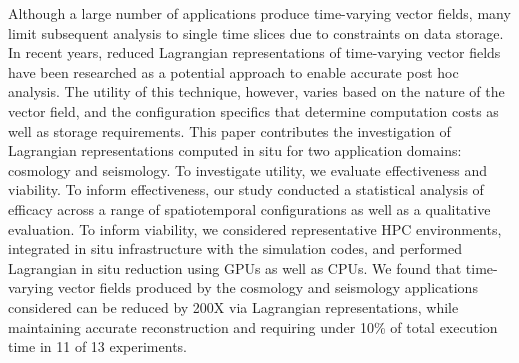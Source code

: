 Although a large number of applications produce time-varying vector fields, many limit subsequent analysis to single time slices due to constraints on data storage.
%
In recent years, reduced Lagrangian representations of time-varying vector fields have been researched as a potential approach to enable accurate post hoc analysis.
%
The utility of this technique, however, varies based on the nature of the vector field, and the configuration specifics that determine computation costs as well as storage requirements.
%
This paper contributes the investigation of Lagrangian representations computed in situ for two application domains: cosmology and seismology.
%
%
To investigate utility, we evaluate effectiveness and viability. 
%
To inform effectiveness, our study conducted a statistical analysis of efficacy across a range of spatiotemporal configurations as well as a qualitative evaluation. %
%
To inform viability, we considered representative HPC environments, integrated in situ infrastructure with the simulation codes, and performed Lagrangian in situ reduction using GPUs as well as CPUs.
%
We found that time-varying vector fields produced by the cosmology and seismology applications considered can be reduced by 200X via Lagrangian representations, while maintaining accurate reconstruction and requiring under 10\% of total execution time in 11 of 13 experiments.
%
%
%
%
